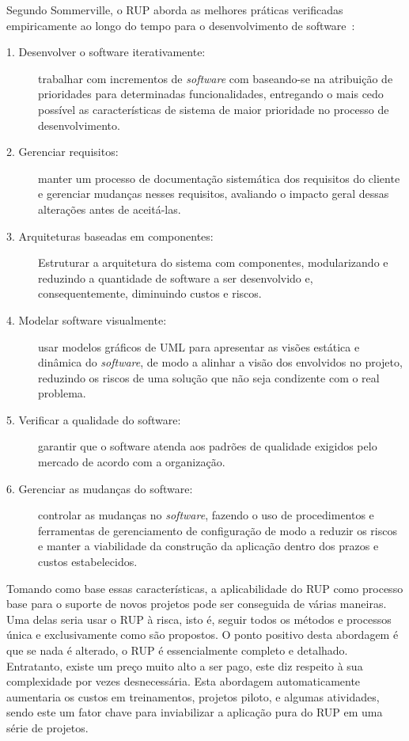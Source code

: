 Segundo Sommerville, o RUP aborda as melhores práticas verificadas empiricamente ao longo do tempo para o desenvolvimento de software~\cite{sommerville}:

\begin{description}
\item[1. Desenvolver o software iterativamente:] trabalhar com incrementos de \textit{software} com baseando-se na atribuição de prioridades para determinadas funcionalidades, entregando o mais cedo possível as características de sistema de maior prioridade no processo de desenvolvimento.
\item[2. Gerenciar requisitos:] manter um processo de documentação sistemática dos requisitos do cliente e gerenciar mudanças nesses requisitos, avaliando o impacto geral dessas alterações antes de aceitá-las.
\item[3. Arquiteturas baseadas em componentes:] Estruturar a arquitetura do sistema com componentes, modularizando e reduzindo a quantidade de software a ser desenvolvido e, consequentemente, diminuindo custos e riscos.
\item[4. Modelar software visualmente:] usar modelos gráficos de UML para apresentar as visões estática e dinâmica do \textit{software}, de modo a alinhar a visão dos envolvidos no projeto, reduzindo os riscos de uma solução que não seja condizente com o real problema.
\item[5. Verificar a qualidade do software:] garantir que o software atenda aos padrões de qualidade exigidos pelo mercado de acordo com a organização.
\item[6. Gerenciar as mudanças do software:] controlar as mudanças no \textit{software}, fazendo o uso de procedimentos e ferramentas de gerenciamento de configuração de modo a reduzir os riscos e manter a viabilidade da construção da aplicação dentro dos prazos e custos estabelecidos.
\end{description}

Tomando como base essas características, a aplicabilidade do RUP como processo base para o suporte de novos projetos pode ser conseguida de várias maneiras. Uma delas seria usar o RUP à risca, isto é, seguir todos os métodos e processos única e exclusivamente como são propostos. O ponto positivo desta abordagem é que se nada é alterado, o RUP é essencialmente completo e detalhado. Entratanto, existe um preço muito alto a ser pago, este diz respeito à sua complexidade por vezes desnecessária. Esta abordagem automaticamente aumentaria os custos em treinamentos, projetos piloto, e algumas atividades, sendo este um fator chave para inviabilizar a aplicação pura do RUP em uma série de projetos.

